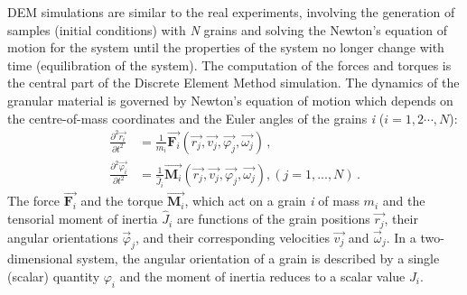 DEM simulations are similar to the real experiments, involving the generation 
of samples (initial conditions) with \textit{N} grains and solving the Newton's 
equation of motion for the system until the properties of the system no longer 
change with time (equilibration of the system). The computation of the forces 
and torques is the central part of the Discrete Element Method simulation. The 
dynamics of the granular material is governed by Newton's equation of motion 
which depends on the centre-of-mass coordinates and 
the Euler angles of the grains \textit{i} ($i = 1, 2 \cdots , N$):
%
\begin{align} 
\frac{{{\partial}^2}{\overrightarrow{r_i}}}{\partial{t^2}} 
&=\frac{1}{m_i}\overrightarrow{{\mathbf{F}}_{i}}(\overrightarrow{r_j},\overrightarrow{v_j},
 \overrightarrow{\varphi_j},\overrightarrow{\omega_j}) \,, \\ 
\frac{{\partial^2}{\overrightarrow{\varphi_i}}}{\partial{t^2}}&
=\frac{1}{{\hat{J}}_i}\overrightarrow{\mathbf{M}_i}
(\overrightarrow{r_j},\overrightarrow{v_j},\overrightarrow{\varphi_j},
   \overrightarrow{\omega_j}), (j=1,...,N) \,.
\end{align}
%
The force $\overrightarrow{\mathbf{F}_{i}}$ and the torque 
$\overrightarrow{\mathbf{M}_{i}}$, which act on a grain \textit{i} of mass 
$\mathit{m}_{\mathit{i}}$ and the tensorial moment of inertia 
${\hat{J}_i}$ are functions of the grain 
positions $\overrightarrow{\mathit{r}_{\mathit{j}}}$, their angular 
orientations $\overrightarrow{\varphi}_{\mathit{j}}$, and their corresponding 
velocities $\overrightarrow{\mathit{v}_{\mathit{j}}}$ and 
$\overrightarrow{\omega}_{\mathit{j}}$. In a two-dimensional system, the 
angular orientation of a grain is described by a single (scalar) quantity 
$\varphi_{i}$ and the moment of inertia reduces to a scalar value 
$\mathit{J}_{i}$. 

%	
%	

